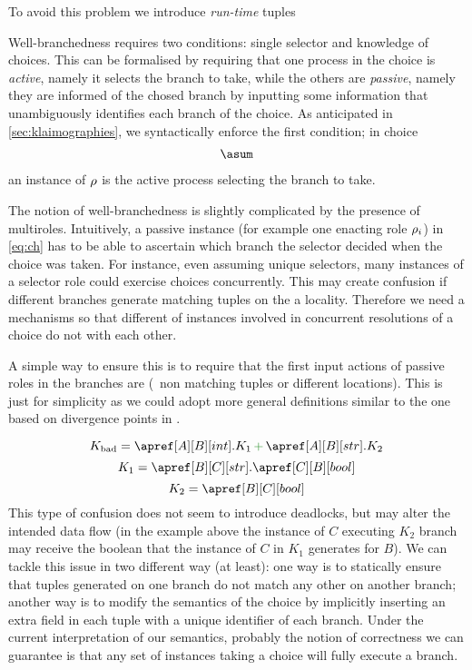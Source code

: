 \hsl

To avoid this problem we introduce \emph{run-time} tuples

Well-branchedness requires two conditions: single selector and knowledge of 
choices.
%
This can be formalised by requiring that one process in the choice is
\emph{active}, namely it selects the branch to take, while the others
are \emph{passive}, namely they are informed of the chosed branch by
inputting some information that unambiguously identifies each branch
of the choice.
%
As anticipated in \cref{sec:klaimographies}, we syntactically enforce
the first condition; in choice
\begin{align}
  \asum\label{eq:ch}
\end{align}
an instance of $\rho$ is the active process selecting the branch to take.


The notion of well-branchedness is slightly complicated by the
presence of multiroles.
%
Intuitively, a passive instance (for example one enacting role
$\rho_i$) in \eqref{eq:ch} has to be able to ascertain which branch
the selector decided when the choice was taken.
%
For instance, even assuming unique selectors, many instances of a
selector role could exercise choices concurrently.
%
This may create confusion if different branches generate matching
tuples on the a locality.
%
Therefore we need a mechanisms so that different  of
instances involved in concurrent resolutions of a choice do not
 with each other.



A simple way to ensure this is to require that the first input actions
of passive roles in the branches are  (\ie\ non matching
tuples or different locations).
%
This is just for simplicity as we could adopt more general definitions
similar to the one based on divergence points in \cite{gt16,gt17}.

\hsl
  \[
    K_\mathrm{bad} = \apref[A][B][int].K_1 \chop \apref[A][B][str].K_2
  \]
  \[
    K_1 = \apref[B][C][str].\apref[C][B][bool]
  \]
  \[
    K_2 = \apref[B][C][bool]
  \]
  This type of confusion does not seem to introduce deadlocks, but may
  alter the intended data flow (in the example above the instance of
  $C$ executing $K_2$ branch may receive the boolean that the instance
  of $C$ in $K_1$ generates for $B$).
  We can tackle this issue in two different way (at least): one way is
  to statically ensure that tuples generated on one branch do not
  match any other on another branch; another way is to modify the
  semantics of the choice by implicitly inserting an extra field in
  each tuple with a unique identifier of each branch.
  \newline
  Under the current interpretation of our semantics, probably the
  notion of correctness we can guarantee is that any set of instances
  taking a choice will fully execute a branch.

